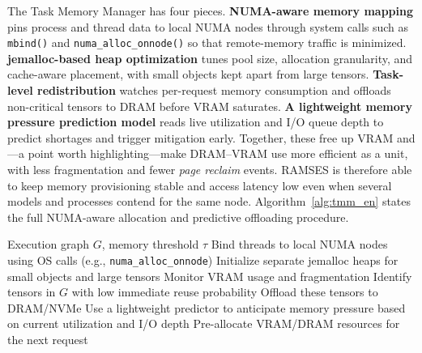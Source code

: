 The Task Memory Manager has four pieces.
\textbf{NUMA-aware memory mapping} pins process and thread data to local NUMA nodes through system calls such as \texttt{mbind()} and \texttt{numa\_alloc\_onnode()} so that remote-memory traffic is minimized.
\textbf{jemalloc-based heap optimization} tunes pool size, allocation granularity, and cache-aware placement, with small objects kept apart from large tensors.
\textbf{Task-level redistribution} watches per-request memory consumption and offloads non-critical tensors to DRAM before VRAM saturates.
\textbf{A lightweight memory pressure prediction model} reads live utilization and I/O queue depth to predict shortages and trigger mitigation early.
Together, these free up VRAM and---a point worth highlighting---make DRAM--VRAM use more efficient as a unit, with less fragmentation and fewer \textit{page reclaim} events. RAMSES is therefore able to keep memory provisioning stable and access latency low even when several models and processes contend for the same node. Algorithm~\ref{alg:tmm_en} states the full NUMA-aware allocation and predictive offloading procedure.

\begin{algorithm}[t]
\caption{Task Memory Manager Pseudocode}
\label{alg:tmm_en}
\begin{algorithmic}[1]
\Require Execution graph $G$, memory threshold $\tau$
\State Bind threads to local NUMA nodes using OS calls (e.g., \texttt{numa\_alloc\_onnode})
\State Initialize separate jemalloc heaps for small objects and large tensors
  \State Monitor VRAM usage and fragmentation
    \State Identify tensors in $G$ with low immediate reuse probability
    \State Offload these tensors to DRAM/NVMe
  \EndIf
  \State Use a lightweight predictor to anticipate memory pressure based on current utilization and I/O depth
  \State Pre-allocate VRAM/DRAM resources for the next request
\EndFor
\end{algorithmic}
\end{algorithm}


